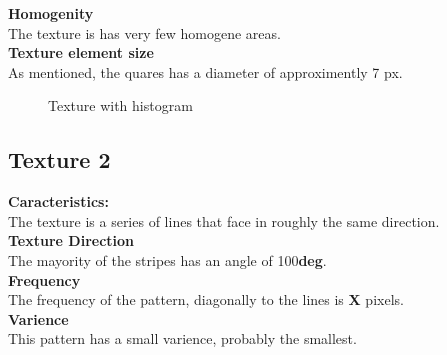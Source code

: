 \documentclass{article}
\begin{document}
\textbf{Homogenity}\\
The texture is has very few homogene areas.\\

\textbf{Texture element size}\\
As mentioned, the quares has a diameter of approximently 7 px.


\begin{figure}[h]%
	\centering
    \qquad
    \caption{Texture with histogram}%
    \label{fig:IMG1}%
\end{figure}

\newpage
\subsection{Texture 2}
\textbf{Caracteristics:}\\
The texture is a series of lines that face in roughly the same direction.
\\

\textbf{Texture Direction}\\
The mayority of the stripes has an angle of 100\textbf{deg}.
\\ 
 
\textbf{Frequency} \\
The frequency of the pattern, diagonally to the lines is \textbf{X} pixels.
\\ 


\textbf{Varience}\\
This pattern has a small varience, probably the smallest.
\\
\end{document}
